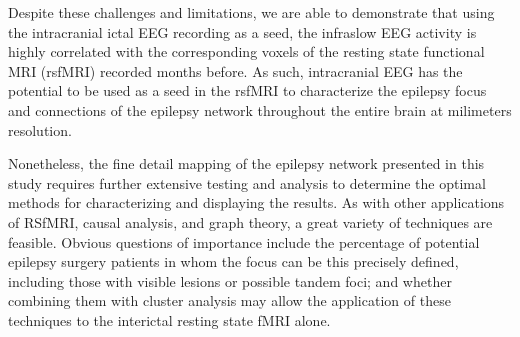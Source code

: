 Despite these challenges and limitations, we are able to demonstrate that using the intracranial ictal EEG recording as a seed, the infraslow EEG activity is highly correlated with the corresponding voxels of the resting state functional MRI (rsfMRI) recorded months before. As such, intracranial EEG has the potential to be used as a seed in the rsfMRI to characterize the epilepsy focus and connections of the epilepsy network throughout the entire brain at milimeters resolution. 

Nonetheless, the fine detail mapping of the epilepsy network presented in this study requires further extensive testing and analysis to determine the optimal methods for characterizing and displaying the results. As with other applications of RSfMRI, causal analysis, and graph theory, a great variety of techniques are feasible. Obvious questions of importance include the percentage of potential epilepsy surgery patients in whom the focus can be this precisely defined, including those with visible lesions or possible tandem foci; and whether combining them with cluster analysis may allow the application of these techniques to the interictal resting state fMRI alone.